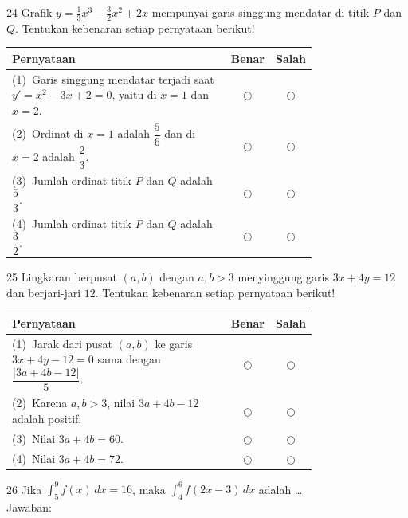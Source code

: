 \documentclass[11pt]{article}
\begin{document}
\begin{soal}{24}
Grafik $y=\tfrac{1}{3}x^3-\tfrac{3}{2}x^2+2x$ mempunyai garis singgung
mendatar di titik $P$ dan $Q$.
Tentukan kebenaran setiap pernyataan berikut!

\par\smallskip
{\renewcommand{\arraystretch}{1.4}%
\begin{tabular}{@{}p{0.76\linewidth}cc@{}}
\hline
\textbf{Pernyataan} & \textbf{Benar} & \textbf{Salah}\\
\hline
(1)~Garis singgung mendatar terjadi saat $y'=x^2-3x+2=0$,
    yaitu di $x=1$ dan $x=2$.
  & $\bigcirc$ & $\bigcirc$\\
(2)~Ordinat di $x=1$ adalah $\dfrac{5}{6}$ dan di $x=2$ adalah
    $\dfrac{2}{3}$.
  & $\bigcirc$ & $\bigcirc$\\
(3)~Jumlah ordinat titik $P$ dan $Q$ adalah $\dfrac{5}{3}$.
  & $\bigcirc$ & $\bigcirc$\\
(4)~Jumlah ordinat titik $P$ dan $Q$ adalah $\dfrac{3}{2}$.
  & $\bigcirc$ & $\bigcirc$\\
\hline
\end{tabular}}
\end{soal}

\begin{soal}{25}
Lingkaran berpusat $(a,b)$ dengan $a,b>3$ menyinggung garis
$3x+4y=12$ dan berjari-jari $12$.
Tentukan kebenaran setiap pernyataan berikut!

\par\smallskip
{\renewcommand{\arraystretch}{1.4}%
\begin{tabular}{@{}p{0.76\linewidth}cc@{}}
\hline
\textbf{Pernyataan} & \textbf{Benar} & \textbf{Salah}\\
\hline
(1)~Jarak dari pusat $(a,b)$ ke garis $3x+4y-12=0$ sama dengan
    $\dfrac{|3a+4b-12|}{5}$.
  & $\bigcirc$ & $\bigcirc$\\
(2)~Karena $a,b>3$, nilai $3a+4b-12$ adalah positif.
  & $\bigcirc$ & $\bigcirc$\\
(3)~Nilai $3a+4b = 60$.
  & $\bigcirc$ & $\bigcirc$\\
(4)~Nilai $3a+4b = 72$.
  & $\bigcirc$ & $\bigcirc$\\
\hline
\end{tabular}}
\end{soal}

\begin{soal}{26}
Jika $\displaystyle\int_5^9 f(x)\,dx=16$, maka
$\displaystyle\int_4^6 f(2x-3)\,dx$ adalah \ldots\\[0.4em]
Jawaban:\enspace\underline{\hspace{4cm}}
\end{soal}
\end{document}
